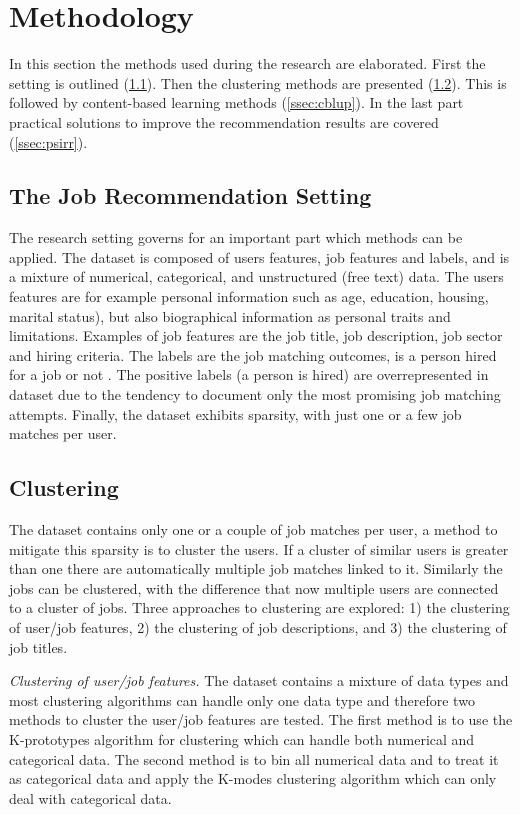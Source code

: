 \section{Methodology}
\label{sec:meth}

In this section the methods used during the research are elaborated. First the setting is outlined (\ref{ssec:jrs}). Then the clustering methods are presented (\ref{ssec:clus}). This is followed by content-based learning methods (\ref{ssec:cblup}). In the last part practical solutions to improve the recommendation results are covered (\ref{ssec:psirr}). 

\subsection{The Job Recommendation Setting}
\label{ssec:jrs}
The research setting governs for an important part which methods can be applied.
The dataset is composed of users features, job features and labels, and is a mixture of numerical, categorical, and unstructured (free text) data.
The users features are for example personal information such as age, education, housing, marital status), but also biographical information as personal traits and limitations. 
Examples of job features are the job title, job description, job sector and hiring criteria. 
The labels are the job matching outcomes, is a person hired for a job or not . 
The positive labels (a person is hired) are overrepresented in dataset due to the tendency to document only the most promising job matching attempts. 
Finally, the dataset exhibits sparsity, with just one or a few job matches per user.

\subsection{Clustering}
\label{ssec:clus}
The dataset contains only one or a couple of job matches per user, a method to mitigate this sparsity is to cluster the users. 
If a cluster of similar users is greater than one there are automatically multiple job matches linked to it. 
Similarly the jobs can be clustered, with the difference that now multiple users are connected to a cluster of jobs. 
Three approaches to clustering are explored: 1) the clustering of user/job features, 2) the clustering of job descriptions, and 3) the clustering of job titles. 

\textit{Clustering of user/job features.}
The dataset contains a mixture of data types and most clustering algorithms can handle only one data type and therefore two methods to cluster the user/job features are tested.
The first method is to use the K-prototypes algorithm \cite{huang1997clustering} for clustering which can handle both numerical and categorical data. 
The second method is to bin all numerical data and to treat it as categorical data and apply the K-modes clustering algorithm \cite{huang1997clustering, huang1998extensions} which can only deal with categorical data. 

